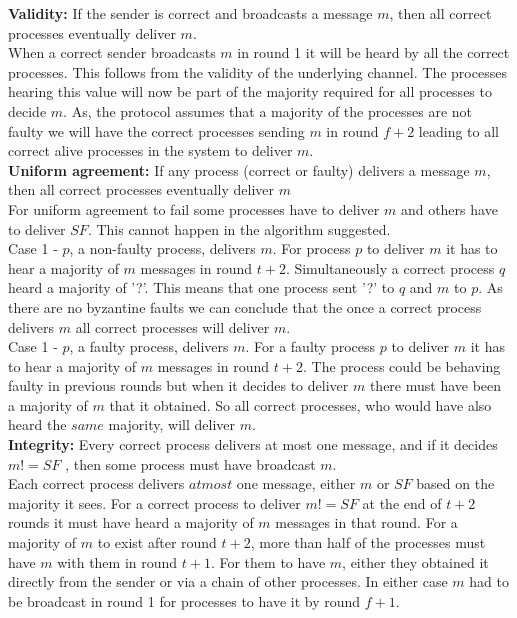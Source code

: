 \documentclass[11pt,a4paper]{article}
\begin{document}
\textbf{Validity:} If the sender is correct and broadcasts a message $m$, then all correct processes eventually deliver $m$.\\

When a correct sender broadcasts $m$ in round 1 it will be heard by all the correct processes. This 
follows from the validity of the underlying channel. The processes hearing this value will now be part of the
majority required for all processes to decide $m$. As, the protocol assumes that a majority of the processes
are not faulty we will have the correct processes sending $m$ in round $f+2$ leading to all correct alive processes in the
system to deliver $m$.
\\

\textbf{Uniform agreement:} If any process (correct or faulty) delivers a
message $m$, then all correct processes eventually deliver $m$\\

For uniform agreement to fail some processes have to deliver $m$ and others have to deliver $SF$. This cannot happen in the algorithm suggested.\\

Case 1 - $p$, a non-faulty process, delivers $m$. For process $p$ to deliver $m$ it has to hear a majority of $m$ messages in round $t+2$. Simultaneously 
a correct process $q$ heard a majority of '?'. This means that one process sent '?' to $q$ and $m$ to $p$. 
As there are no byzantine faults we can conclude that the once a correct process delivers $m$ all correct processes will deliver $m$. \\

Case 1 - $p$, a faulty process, delivers $m$. For a faulty process $p$ to deliver $m$ it has to hear a majority of $m$ messages in round $t+2$. The process 
could be behaving faulty in previous rounds but when it decides to deliver $m$ there must have been a majority of $m$ that it obtained. So all correct processes, 
who would have also heard the $same$ majority, will deliver $m$.
 \\

\textbf{Integrity:} Every correct process delivers at most one message, and if it decides $m != SF$ , then some process must have broadcast $m$.\\

Each correct process delivers $atmost$ one message, either $m$ or $SF$ based on the majority it sees.
For a correct process to deliver $m != SF$ at the end of $t+2$ rounds it must have heard a
majority of $m$ messages in that round. For a majority of $m$ to exist after round $t+2$, more than half of the
processes must have $m$ with them in round $t+1$. For them to have $m$, either they obtained it directly from the sender 
or via a chain of other processes. In either case $m$ had to be broadcast in round 1 for processes to have it
by round $f+1$.\\
\end{document}
